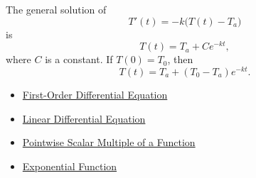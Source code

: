 \begin{remark*}[Examples]
The general solution of
\[
T'(t)=-k\bigl(T(t)-T_a\bigr)
\]
is
\[
T(t)=T_a+Ce^{-kt},
\]
where $C$ is a constant. If $T(0)=T_0$, then
\[
T(t)=T_a+(T_0-T_a)e^{-kt}.
\]
\end{remark*}

\begin{dependencies}
\begin{itemize}
  \item \hyperref[def:ordinary-differential-equations-terminology-first-order-differential-equation]{First-Order Differential Equation}
  \item \hyperref[def:ordinary-differential-equations-terminology-linear-differential-equation]{Linear Differential Equation}
  \item \hyperref[def:pointwise-scalar-multiple-of-a-function]{Pointwise Scalar Multiple of a Function}
  \item \hyperref[def:exponential]{Exponential Function}
\end{itemize}
\end{dependencies}
